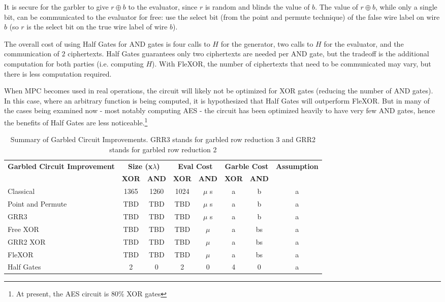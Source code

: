 It is secure for the garbler to give $r \oplus b$ to the evaluator, since $r$ is random and blinds the value of $b$. 
The value of $r \oplus b$, while only a single bit, can be communicated to the evaluator for free: use the select bit (from the point and permute technique) of the false wire label on wire $b$ (so $r$ is the select bit on the true wire label of wire $b$).

The overall cost of using Half Gates for AND gates is four calls to $H$ for the generator, two calls to $H$ for the evaluator, and the communication of $2$ ciphertexts. 
Half Gates guarantees only two ciphertexts are needed per AND gate, but the tradeoff is the additional computation for both parties (i.e. computing $H$).
With FleXOR, the number of ciphertexts that need to be communicated may vary, but there is less computation required.

When MPC becomes used in real operations, the circuit will likely not be optimized for XOR gates (reducing the number of AND gates). 
In this case, where an arbitrary function is being computed, it is hypothesized that Half Gates will outperform FleXOR. 
But in many of the cases being examined now - most notably computing AES - the circuit has been optimized heavily to have very few AND gates, hence the benefits of Half Gates are less noticeable.\footnote{At present, the AES circuit is 80\% XOR gates} 

\begin{table}[h]
  \centering
  \renewcommand{\arraystretch}{1.2}
\begin{adjustbox}{width=1\textwidth}
  \begin{tabular}{|p{5cm}|c|c|c|c|c|c|c|}
    \hline
    \multirow{2}{5cm}{\centering \textbf{Garbled Circuit Improvement}} & 
    \multicolumn{2}{c|}{\textbf{Size (x$\lambda$)}} & 
    \multicolumn{2}{c|}{\textbf{Eval Cost}} & 
    \multicolumn{2}{c|}{\textbf{Garble Cost}} &
    \multirow{2}{3cm}{\centering \textbf{Assumption}} \\
    \cline{2-7}
    & \textbf{XOR} & \textbf{AND} & \textbf{XOR} & \textbf{AND}  & \textbf{XOR} & \textbf{AND} & \\
    \hline
    Classical & 1365 & 1260 & 1024 & $\mu$ s & a & b & a\\ \hline
    Point and Permute & TBD & TBD & TBD & $\mu$ s & a & b & a\\ \hline
    GRR3 & TBD & TBD & TBD & $\mu$ s  & a & b& a\\ \hline
    Free XOR & TBD & TBD & TBD & $\mu$ & a & bs& a  \\ \hline
    GRR2 XOR & TBD & TBD & TBD & $\mu$ & a & bs  & a\\ \hline
    FleXOR& TBD & TBD & TBD & $\mu$ & a & bs & a \\ \hline
    Half Gates & 2 & 0 & 2 & 0 & 4 & 0 & a \\ \hline
  \end{tabular}
  \end{adjustbox}
  \caption{Summary of Garbled Circuit Improvements. GRR3 stands for garbled row reduction 3 and GRR2 stands for garbled row reduction 2}
\end{table}


